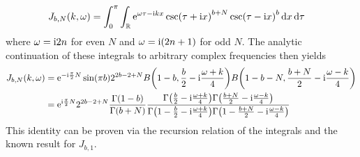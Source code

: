 \documentclass[english, parskip=full]{scrartcl}
\begin{document}
\begin{align}
J_{b,N}(k,\omega) &= \int_{0}^{\pi} \int_{\mathbb{R}} \text{e}^{\omega\tau - \text{i} kx} \csc(\tau + \text{i} x)^{b+N} \csc(\tau - \text{i} x)^b \, \mathrm{d}x  \,\mathrm{d}\tau
\end{align}
where $\omega = \text{i} 2n$ for even $N$ and $\omega = \text{i} (2n+1)$ for odd $N$.
The analytic continuation of these integrals to arbitrary complex frequencies then yields
\begin{align}
J_{b,N}(k,\omega) &= \powe{-\i \frac{\pi}{2}N} \sin(\pi b) 2^{2b-2+N} B\kla*{1-b, \frac{b}{2} - \i \frac{\omega + k}{4}} B\kla*{1-b-N, \frac{b+N}{2} - \i\frac{\omega-k}{4}}\\
&= \powe{\i \frac{\pi}{2}N} 2^{2b-2+N} \frac{\Gamma(1-b)}{\Gamma(b+N)} \frac{\Gamma\kla*{ \frac{b}{2} - \i \frac{\omega + k}{4}}\Gamma\kla*{\frac{b+N}{2} - \i \frac{\omega - k}{4}}}{\Gamma\kla*{1-\frac{b}{2} - \i \frac{\omega + k}{4}}\Gamma\kla*{1-\frac{b+N}{2} - \i \frac{\omega - k}{4}}}
\end{align}
This identity can be proven via the recursion relation of the integrals and the known result for $J_{b,1}$.
\end{document}
